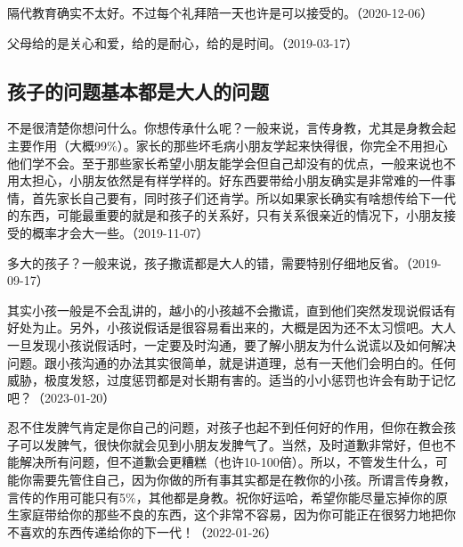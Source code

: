 隔代教育确实不太好。不过每个礼拜陪一天也许是可以接受的。（2020-12-06）


父母给的是关心和爱，给的是耐心，给的是时间。（2019-03-17）

\subsection{孩子的问题基本都是大人的问题}


不是很清楚你想问什么。你想传承什么呢？一般来说，言传身教，尤其是身教会起主要作用（大概99\%）。家长的那些坏毛病小朋友学起来快得很，你完全不用担心他们学不会。至于那些家长希望小朋友能学会但自己却没有的优点，一般来说也不用太担心，小朋友依然是有样学样的。好东西要带给小朋友确实是非常难的一件事情，首先家长自己要有，同时孩子们还肯学。所以如果家长确实有啥想传给下一代的东西，可能最重要的就是和孩子的关系好，只有关系很亲近的情况下，小朋友接受的概率才会大一些。（2019-11-07）


多大的孩子？一般来说，孩子撒谎都是大人的错，需要特别仔细地反省。（2019-09-17）


其实小孩一般是不会乱讲的，越小的小孩越不会撒谎，直到他们突然发现说假话有好处为止。另外，小孩说假话是很容易看出来的，大概是因为还不太习惯吧。大人一旦发现小孩说假话时，一定要及时沟通，要了解小朋友为什么说谎以及如何解决问题。跟小孩沟通的办法其实很简单，就是讲道理，总有一天他们会明白的。任何威胁，极度发怒，过度惩罚都是对长期有害的。适当的小小惩罚也许会有助于记忆吧？（2023-01-20）


忍不住发脾气肯定是你自己的问题，对孩子也起不到任何好的作用，但你在教会孩子可以发脾气，很快你就会见到小朋友发脾气了。当然，及时道歉非常好，但也不能解决所有问题，但不道歉会更糟糕（也许10-100倍）。所以，不管发生什么，可能你需要先管住自己，因为你做的所有事其实都是在教你的小孩。所谓言传身教，言传的作用可能只有5\%，其他都是身教。祝你好运哈，希望你能尽量忘掉你的原生家庭带给你的那些不良的东西，这个非常不容易，因为你可能正在很努力地把你不喜欢的东西传递给你的下一代！（2022-01-26）

